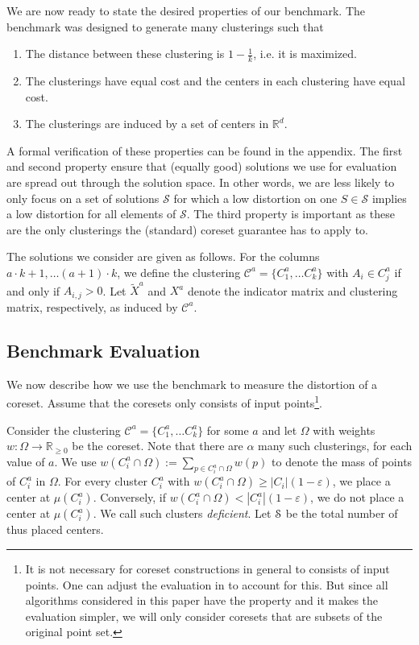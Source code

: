 We are now ready to state the desired properties of our benchmark. The benchmark was designed to generate many clusterings such that
\begin{enumerate}
\item The distance between these clustering is $1-\frac{1}{k}$, i.e. it is maximized.
\item The clusterings have equal cost and the centers in each clustering have equal cost.
\item The clusterings are induced by a set of centers in $\mathbb{R}^d$.
\end{enumerate}

A formal verification of these properties can be found in the appendix.
The first and second property ensure that (equally good) solutions we use for evaluation are spread out through the solution space. In other words, we are less likely to only focus on a set of solutions $\mathcal{S}$ for which a low distortion on one $S\in\mathcal{S}$ implies a low distortion for all elements of $\mathcal{S}$.
The third property is important as these are the only clusterings the (standard) coreset guarantee has to apply to. 

The solutions we consider are given as follows. For the columns $a\cdot k+1,\ldots (a+1)\cdot k$, we define the clustering $\mathcal{C}^{a} = \{C_1^a,\ldots C_k^a\}$ with 
$A_i\in C_j^a$ if and only if $A_{i,j} > 0$. Let $\tilde X^a$ and $X^{a}$ denote the indicator matrix and clustering matrix, respectively, as induced by $\mathcal{C}^{a}$.



\subsection{Benchmark Evaluation}

We now describe how we use the benchmark to measure the distortion of a coreset. Assume that the coresets only consists of input points\footnote{It is not necessary for coreset constructions in general to consists of input points. One can adjust the evaluation in to account for this. But since all algorithms considered in this paper have the property and it makes the evaluation simpler, we will only consider coresets that are subsets of the original point set.}.

Consider the clustering $\mathcal{C}^{a} = \{C_1^a,\ldots C_k^a\}$ for some $a$ and let $\Omega$ with weights $w:\Omega\rightarrow \mathbb{R}_{\geq 0}$ be the coreset. 
Note that there are $\alpha$ many such clusterings, for each value of $a$.
We use $w(C_i^a \cap \Omega):=\sum_{p\in C_i^a \cap \Omega} w(p)$ to denote the mass of points of $C_i^a$ in $\Omega$.
For every cluster $C_i^a$ with $w(C_i^a \cap \Omega)\geq |C_i| (1-\varepsilon)$, we place a center at $\mu(C_i^a)$. Conversely, if $w(C_i^a \cap \Omega)< |C_i^a| (1-\varepsilon)$, we do not place a center at $\mu(C_i^a)$. We call such clusters \emph{deficient}. Let $\mathcal{S}$ be the total number of thus placed centers.

